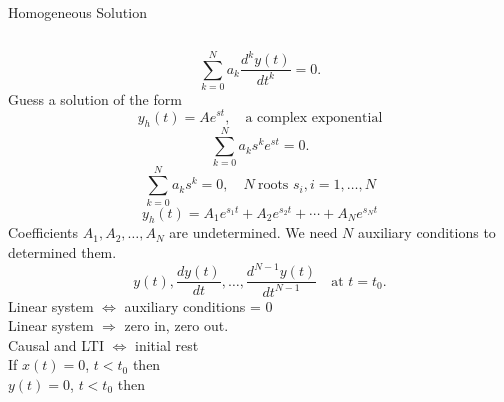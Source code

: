 \begin{frame}[plain]{Homogeneous Solution}

    \begin{columns}
            \begin{equation*}
                \sum_{k=0}^{N}a_k \frac{d^ky(t)}{dt^k} = 0.
            \end{equation*}
            Guess a solution of the form
            \begin{equation*}
                y_h(t) = Ae^{st}, \quad \text{a complex exponential}
            \end{equation*} \pause
            {
            \begin{equation*}
                \sum_{k=0}^{N}a_ks^k e^{st} = 0.
            \end{equation*}
            \pause
            \begin{equation*}
                \sum_{k=0}^{N}a_ks^k = 0, \quad N ~\text{roots } s_i, i = 1, \dots, N
            \end{equation*}
            }
            \pause
            \begin{equation*}
                y_h(t) = A_1e^{s_1t} + A_2e^{s_2t} + \cdots + A_Ne^{s_Nt}
            \end{equation*}
            Coefficients $A_1, A_2, \dots, A_N$ are undetermined. We need $N$ auxiliary conditions to determined them.
            \begin{equation*}
                y(t), \frac{dy(t)}{dt}, \dots, \frac{d^{N-1}y(t)}{dt^{N-1}}\quad \text{at } t= t_0.
            \end{equation*}
            \pause
            Linear system $\Longleftrightarrow$ auxiliary conditions = 0\\
            Linear system $\Rightarrow$ zero in, zero out.\\
            Causal and LTI $\Longleftrightarrow$ initial rest\\
            If $x(t) = 0$, $t<t_0$ then\\
            $y(t) = 0$, $t<t_0$ then
    \end{columns}

\end{frame}


